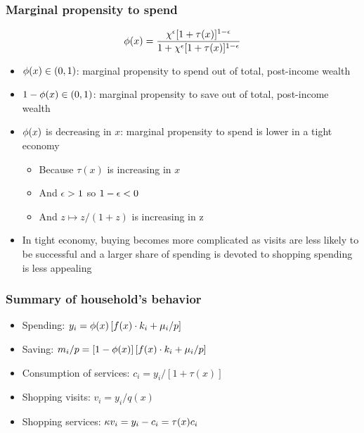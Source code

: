 \documentclass[11pt,aspectratio=169,xcolor={dvipsnames},hyperref={pdftex,pdfpagemode=UseNone,hidelinks,pdfdisplaydoctitle=true},usepdftitle=false]{beamer}
\begin{document}
\begin{frame}
\frametitle{Marginal propensity to spend}
\vspace*{-5mm}\begin{equation*}
\phi(x) =  \frac{\chi^{\epsilon} [1+\tau(x)]^{1 - \epsilon}}{1 + \chi^{\epsilon}[1+\tau(x)]^{1 - \epsilon}}
\end{equation*}\vspace*{-5mm}
\begin{itemize}
\item $\phi(x)\in (0,1)$: marginal propensity to spend out of total, post-income wealth
\item $1-\phi(x)\in (0,1)$: marginal propensity to save out of total, post-income wealth
\item $\phi(x)$ is decreasing in $x$: marginal propensity to spend is lower in a tight economy
\begin{itemize}
	\item Because $\tau(x)$ is increasing in $x$
	\item And $\epsilon>1$ so $1-\epsilon<0$
	\item And $z \mapsto z/(1+z)$ is increasing in z
\end{itemize}
\item In tight economy, buying becomes more complicated as visits are less likely to be successful and a larger share of spending is devoted to shopping \then spending is less appealing
\end{itemize}	
\end{frame}

\begin{frame}
\frametitle{Summary of household's behavior}
\begin{itemize}
\item Spending: $y_i = \phi(x) \left[ f(x)\cdot k_i + \mu_i/p \right]$
\item Saving: $m_i/p = [1-\phi(x)] \left[ f(x)\cdot k_i + \mu_i/p \right]$
\item Consumption of services: $c_i = y_i/[1+\tau(x)]$
\item Shopping visits: $v_i = y_i/q(x)$
\item Shopping services: $\kappa v_i = y_i - c_i = \tau(x) c_i$
\end{itemize}	
\end{frame}

\begin{frame}
\end{frame}
\end{document}

